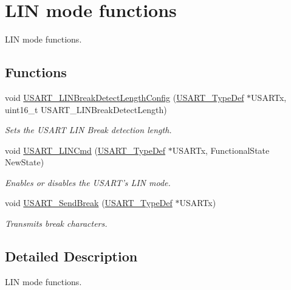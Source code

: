 \hypertarget{group___u_s_a_r_t___group4}{}\section{L\+I\+N mode functions}
\label{group___u_s_a_r_t___group4}


L\+I\+N mode functions.  


\subsection*{Functions}
\begin{DoxyCompactItemize}
\item 
void \hyperlink{group___u_s_a_r_t___group4_ga7bc2d291831cbc5e53e73337308029b5}{U\+S\+A\+R\+T\+\_\+\+L\+I\+N\+Break\+Detect\+Length\+Config} (\hyperlink{struct_u_s_a_r_t___type_def}{U\+S\+A\+R\+T\+\_\+\+Type\+Def} $\ast$U\+S\+A\+R\+Tx, uint16\+\_\+t U\+S\+A\+R\+T\+\_\+\+L\+I\+N\+Break\+Detect\+Length)
\begin{DoxyCompactList}\small\item\em Sets the U\+S\+A\+R\+T L\+I\+N Break detection length. \end{DoxyCompactList}\item 
void \hyperlink{group___u_s_a_r_t___group4_ga9fdd6296f4ca4acdfcbd58bf56bd4185}{U\+S\+A\+R\+T\+\_\+\+L\+I\+N\+Cmd} (\hyperlink{struct_u_s_a_r_t___type_def}{U\+S\+A\+R\+T\+\_\+\+Type\+Def} $\ast$U\+S\+A\+R\+Tx, Functional\+State New\+State)
\begin{DoxyCompactList}\small\item\em Enables or disables the U\+S\+A\+R\+T's L\+I\+N mode. \end{DoxyCompactList}\item 
void \hyperlink{group___u_s_a_r_t___group4_ga39a3d33e23ee28529fa8f7259ce6811e}{U\+S\+A\+R\+T\+\_\+\+Send\+Break} (\hyperlink{struct_u_s_a_r_t___type_def}{U\+S\+A\+R\+T\+\_\+\+Type\+Def} $\ast$U\+S\+A\+R\+Tx)
\begin{DoxyCompactList}\small\item\em Transmits break characters. \end{DoxyCompactList}\end{DoxyCompactItemize}


\subsection{Detailed Description}
L\+I\+N mode functions. 

